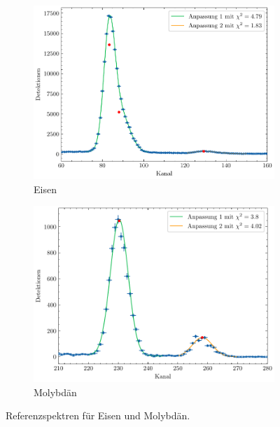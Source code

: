 \begin{figure}[H]
    \centering
    \begin{subfigure}{0.45\textwidth}
        \centering
        \includegraphics[width=\linewidth]{../figs/Fe}
        \caption{Eisen}
    \end{subfigure}
    \begin{subfigure}{0.45\textwidth}
        \centering
        \includegraphics[width=\linewidth]{../figs/Mo}
        \caption{Molybdän}
    \end{subfigure}
    \caption{Referenzspektren für Eisen und Molybdän.}\label{fig:fe_mo}
\end{figure}
